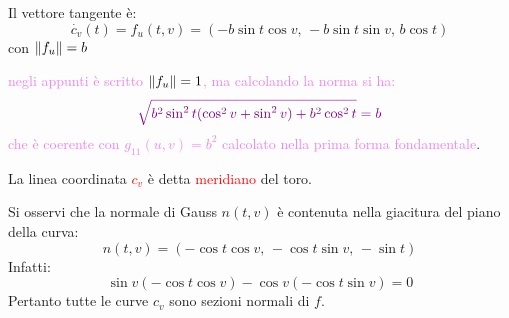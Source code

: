 \begin{esempio}
\begin{itemize}
            Il vettore tangente è:
            \[
            \dot{c_v}(t) = f_u(t,v) = (-b \sin t \cos v, \, -b \sin t \sin v, \, b \cos t)
            \]
            con $\lVert f_u\rVert = b$ 
            
            \textcolor{violet}{negli appunti è scritto $\lVert f_u\rVert = 1$, ma calcolando la norma si ha: }
            \[ \color{violet} \sqrt{b^2 \sin^2 t (\cos^2 v + \sin^2 v) + b^2 \cos^2 t} = b \]
            \textcolor{violet}{ che è coerente con $g_{11}(u,v) = b^2$ calcolato nella prima forma fondamentale}.
            
            La linea coordinata \textcolor{red}{$c_v$} è detta \textcolor{red}{meridiano} del toro.
            
            Si osservi che la normale di Gauss $n(t,v)$ è contenuta nella giacitura del piano della curva:
            \[
            n(t,v) = (-\cos t \cos v, \, -\cos t \sin v, \, -\sin t)
            \]
            Infatti:
            \[
            \sin v (-\cos t \cos v) - \cos v (-\cos t \sin v) = 0
            \]
            Pertanto tutte le curve $c_v$ sono sezioni normali di $f$.
        \end{itemize}
        \begin{center}
\end{center}
\end{esempio}
